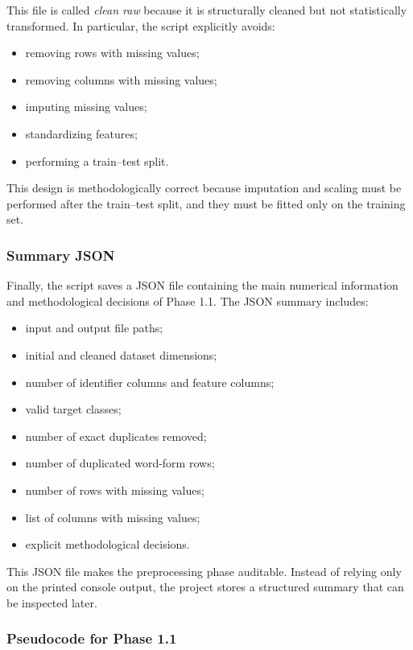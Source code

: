 \documentclass{ipgpmaster}
\begin{document}
This file is called \emph{clean raw} because it is structurally cleaned but not statistically transformed. In particular, the script explicitly avoids:

\begin{itemize}
    \item removing rows with missing values;
    \item removing columns with missing values;
    \item imputing missing values;
    \item standardizing features;
    \item performing a train--test split.
\end{itemize}

This design is methodologically correct because imputation and scaling must be performed after the train--test split, and they must be fitted only on the training set.

\subsubsection{Summary JSON}

Finally, the script saves a JSON file containing the main numerical information and methodological decisions of Phase 1.1. The JSON summary includes:

\begin{itemize}
    \item input and output file paths;
    \item initial and cleaned dataset dimensions;
    \item number of identifier columns and feature columns;
    \item valid target classes;
    \item number of exact duplicates removed;
    \item number of duplicated word-form rows;
    \item number of rows with missing values;
    \item list of columns with missing values;
    \item explicit methodological decisions.
\end{itemize}

This JSON file makes the preprocessing phase auditable. Instead of relying only on the printed console output, the project stores a structured summary that can be inspected later.

\subsubsection{Pseudocode for Phase 1.1}
\end{document}
